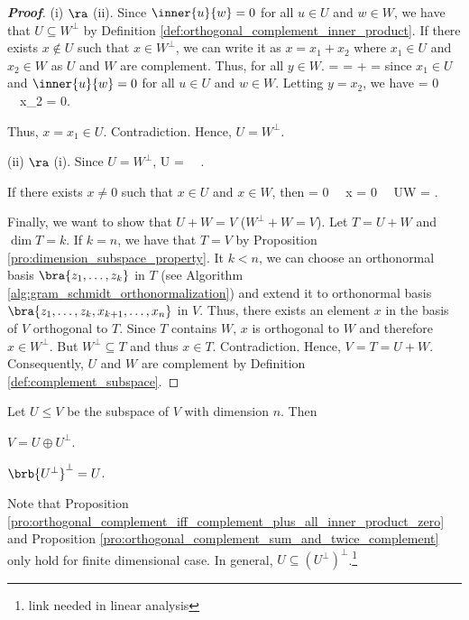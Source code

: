 \begin{proof}[\bf Proof]
(i) $\ra$ (ii). Since $\inner{u}{w} =0$ for all $u\in U$ and $w\in W$, we have that $U \subseteq W^\perp$ by Definition \ref{def:orthogonal_complement_inner_product}. If there exists $x\notin U$ such that $x\in W^\perp$, we can write it as $x = x_1 +x_2$ where $x_1\in U$ and $x_2\in W$ as $U$ and $W$ are complement. Thus, for all $y\in W$.
 =  =  +  = 
\ee
since $x_1\in U$ and $\inner{u}{w} =0$ for all $u\in U$ and $w\in W$. Letting $y = x_2$, we have
\be
{} = 0 \ \ra\ x_2 = 0.
\ee

Thus, $x=x_1\in U$. Contradiction. Hence, $U = W^\perp$.

(ii) $\ra$ (i). Since $U = W^\perp$,
\be
U =  \ \ra\ .
\ee

If there exists $x\neq 0$ such that $x\in U$ and $x\in W$, then
\be
{} = 0 \ \ra\ x = 0  \ \ra\ U\cap W = .
\ee

Finally, we want to show that $U+W = V$ ($W^\perp + W = V$). Let $T = U+W$ and $\dim T = k$. If $k = n$, we have that $T = V$ by Proposition \ref{pro:dimension_subspace_property}. It $k<n$, we can choose an orthonormal basis $\bra{z_1,\dots,z_k}$ in $T$ (see Algorithm \ref{alg:gram_schmidt_orthonormalization}) and extend it to orthonormal basis $\bra{z_1,\dots,z_k,x_{k+1},\dots,x_n}$ in $V$. Thus, there exists an element $x$ in the basis of $V$ orthogonal to $T$. Since $T$ contains $W$, $x$ is orthogonal to $W$ and therefore $x\in W^\perp$. But $W^\perp \subseteq T$ and thus $x\in T$. Contradiction. Hence, $V = T = U+W$. Consequently, $U$ and $W$ are complement by Definition \ref{def:complement_subspace}.
\end{proof}



\begin{proposition}\label{pro:orthogonal_complement_sum_and_twice_complement}
Let $U\leq V$ be the subspace of $V$ with dimension $n$. Then
\ben
\item [(i)] $V = U\oplus U^\perp$.
\item [(ii)] $\brb{U^\perp}^\perp = U$.
\een
\end{proposition}

\begin{remark}
Note that Proposition \ref{pro:orthogonal_complement_iff_complement_plus_all_inner_product_zero} and Proposition \ref{pro:orthogonal_complement_sum_and_twice_complement} only hold for finite dimensional case. In general, $U \subseteq (U^{\perp})^\perp$.\footnote{link needed in linear analysis}
\end{remark}

